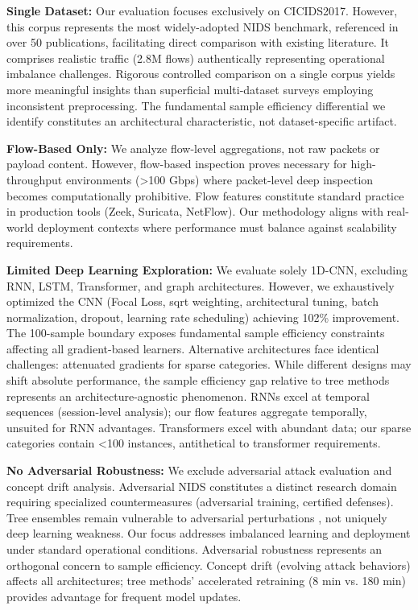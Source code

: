 \documentclass[10pt,twocolumn]{article}
\begin{document}
\textbf{Single Dataset:} Our evaluation focuses exclusively on CICIDS2017. However, this corpus represents the most widely-adopted NIDS benchmark, referenced in over 50 publications, facilitating direct comparison with existing literature. It comprises realistic traffic (2.8M flows) authentically representing operational imbalance challenges. Rigorous controlled comparison on a single corpus yields more meaningful insights than superficial multi-dataset surveys employing inconsistent preprocessing. The fundamental sample efficiency differential we identify constitutes an architectural characteristic, not dataset-specific artifact.

\textbf{Flow-Based Only:} We analyze flow-level aggregations, not raw packets or payload content. However, flow-based inspection proves necessary for high-throughput environments (>100 Gbps) where packet-level deep inspection becomes computationally prohibitive. Flow features constitute standard practice in production tools (Zeek, Suricata, NetFlow). Our methodology aligns with real-world deployment contexts where performance must balance against scalability requirements.

\textbf{Limited Deep Learning Exploration:} We evaluate solely 1D-CNN, excluding RNN, LSTM, Transformer, and graph architectures. However, we exhaustively optimized the CNN (Focal Loss, sqrt weighting, architectural tuning, batch normalization, dropout, learning rate scheduling) achieving 102\% improvement. The 100-sample boundary exposes fundamental sample efficiency constraints affecting all gradient-based learners. Alternative architectures face identical challenges: attenuated gradients for sparse categories. While different designs may shift absolute performance, the sample efficiency gap relative to tree methods represents an architecture-agnostic phenomenon. RNNs excel at temporal sequences (session-level analysis); our flow features aggregate temporally, unsuited for RNN advantages. Transformers excel with abundant data; our sparse categories contain <100 instances, antithetical to transformer requirements.

\textbf{No Adversarial Robustness:} We exclude adversarial attack evaluation and concept drift analysis. Adversarial NIDS constitutes a distinct research domain requiring specialized countermeasures (adversarial training, certified defenses). Tree ensembles remain vulnerable to adversarial perturbations \cite{adversarial_trees}, not uniquely deep learning weakness. Our focus addresses imbalanced learning and deployment under standard operational conditions. Adversarial robustness represents an orthogonal concern to sample efficiency. Concept drift (evolving attack behaviors) affects all architectures; tree methods' accelerated retraining (8 min vs. 180 min) provides advantage for frequent model updates.
\end{document}
